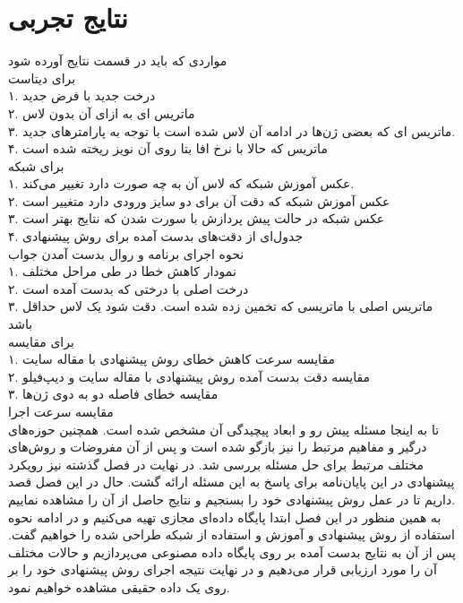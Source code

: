 
\chapter{نتایج تجربی}

مواردی که باید در قسمت نتایج آورده شود\\

برای دیتاست\\
۱. درخت جدید با فرض جدید\\
۲. ماتریس ای به ازای آن بدون لاس\\
۳.  ماتریس ای که بعضی ژن‌ها در ادامه آن لاس شده است با توجه به پارامترهای جدید.\\
۴. ماتریس که حالا با نرخ افا بتا روی آن نویز ریخته شده است\\


برای شبکه\\
۱. عکس آموزش شبکه که لاس آن به چه صورت دارد تغییر می‌کند.\\
۲. عکس آموزش شبکه که دقت آن برای دو سایز ورودی دارد متغییر است\\
۳. عکس شبکه در حالت پیش پردازش با سورت شدن که نتایج بهتر است\\
۴. جدول‌ای از دقت‌های بدست آمده برای روش پیشنهادی\\


نحوه اجرای برنامه و روال بدست آمدن جواب\\
۱. نمودار کاهش خطا در طی مراحل مختلف\\
۲. درخت اصلی با درختی که بدست آمده است\\
۳. ماتریس اصلی با ماتریسی که تخمین زده شده است. دقت شود یک لاس حداقل باشد\\


برای مقایسه\\
۱. مقایسه سرعت کاهش خطای روش پیشنهادی با مقاله سایت\\
۲. مقایسه دقت بدست آمده روش پیشنهادی با مقاله سایت و دیپ‌فیلو\\
۳. مقایسه خطای فاصله دو به دوی ژن‌ها\\


مقایسه سرعت اجرا\\

تا به اینجا مسئله پیش رو و ابعاد پیچیدگی آن مشخص شده است. همچنین حوزه‌های درگیر و مفاهیم مرتبط را نیز بازگو شده است و پس از آن مفروضات و روش‌های مختلف مرتبط برای حل مسئله بررسی شد. 
در نهایت در فصل گذشته نیز رویکرد پیشنهادی در این پایان‌نامه برای پاسخ به این مسئله ارائه گشت. حال در این فصل قصد داریم تا در عمل روش پیشنهادی خود را بسنجیم و نتایج حاصل از آن را مشاهده نماییم.
\\
به همین منظور در این فصل ابتدا پایگاه داده‌ای مجازی تهیه می‌کنیم و در ادامه نحوه استفاده از روش پیشنهادی و آموزش و استفاده از شبکه طراحی شده را خواهیم گفت. پس از آن به نتایج بدست آمده بر روی پایگاه داده مصنوعی می‌پردازیم و حالات مختلف آن را مورد ارزیابی قرار می‌دهیم و در نهایت نتیجه اجرای روش پیشنهادی خود را بر روی یک داده حقیقی مشاهده خواهیم نمود.


